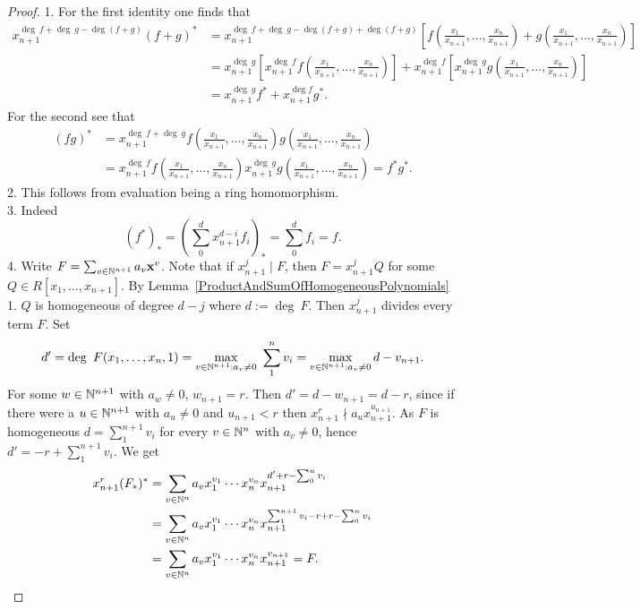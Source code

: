 \begin{proof}
    1. For the first identity one finds that 
    \begin{align*}
        x_{n+1}^{\deg\ f +\deg \ g - \deg( f+g)}(f+g)^\ast &=x_{n+1}^{\deg\ f +\deg \ g - \deg( f+g)+\deg(f+g)}\left[f\left(\frac{x_1}{x_{n+1}},\dots,\frac{x_n}{x_{n+1}}\right) + g\left(\frac{x_1}{x_{n+1}},\dots,\frac{x_n}{x_{n+1}}\right)\right]\\ &= x_{n+1}^{\deg\ g}\left[x_{n+1}^{\deg\ f}f\left(\frac{x_1}{x_{n+1}},\dots,\frac{x_n}{x_{n+1}}\right)\right] + x_{n+1}^{\deg\ f}\left[x_{n+1}^{\deg\ g}g\left(\frac{x_1}{x_{n+1}},\dots,\frac{x_n}{x_{n+1}}\right)\right]\\
        &= x_{n+1}^{\deg\ g}f^\ast+x_{n+1}^{\deg f}g^\ast.
    \end{align*}
    For the second see that
    \begin{align*}
        \left(fg\right)^\ast &= x_{n+1}^{\deg\ f+ \deg \ g} f\left(\frac{x_1}{x_{n+1}},\dots,\frac{x_n}{x_{n+1}}\right)g\left(\frac{x_1}{x_{n+1}},\dots,\frac{x_n}{x_{n+1}}\right)\\  &= x_{n+1}^{\deg \ f}f\left(\frac{x_1}{x_{n+1}},\dots,\frac{x_n}{x_{n+1}}\right)x_{n+1}^{\deg\ g}g\left(\frac{x_1}{x_{n+1}},\dots,\frac{x_n}{x_{n+1}}\right)=f^\ast g^\ast.
    \end{align*}
    2. This follows from evaluation being a ring homomorphism.\\
    3. Indeed
    $$(f^\ast)_\ast = \left(\sum_0^d x_{n+1}^{d-i}f_i\right)_\ast= \sum_0^df_i =f.$$
    4. Write $F=\sum_{v\in\mathbb{N}^{n+1}} a_v\mathbf{x}^v$. Note that if $x_{n+1}^j\mid F$, then $F= x_{n+1}^j Q$ for some $Q\in R[x_1,\dots,x_{n+1}]$. By Lemma~\ref{ProductAndSumOfHomogeneousPolynomials} 1. $Q$ is homogeneous of degree $d-j$ where $d := \deg \ F$. Then $x_{n+1}^j$ divides every term $F$. Set 
    $$d' = \deg \ F(x_1,\dots,x_n,1) = \max_{v\in\mathbb{N}^{n+1} : a_v\neq 0}\ \sum_1^n v_i = \max_{v\in\mathbb{N}^{n+1}:a_v\neq0} d-v_{n+1}.$$
    For some $w\in\mathbb{N}^{n+1}$ with $a_w\neq0$, $w_{n+1} = r$. Then $d' = d-w_{n+1}=d-r$, since if there were a $u\in \mathbb{N}^{n+1}$ with $a_u\neq0 $ and $u_{n+1}<r$ then $x_{n+1}^r\nmid a_ux_{n+1}^{u_{n+1}}.$ As $F$ is homogeneous $d = \sum_1^{n+1} v_i$ for every $v\in \mathbb{N}^n$ with $a_v\neq0$, hence $d' = -r+\sum_1^{n+1}v_i$. We get
    \begin{align*}
        x_{n+1}^r(F_\ast)^\ast &= \sum_{v\in \mathbb{N}^{n}} a_v x_1^{v_1}\cdots x_{n}^{v_n}x_{n+1}^{d'+r-\sum_0^n v_i}\\
        &=\sum_{v\in \mathbb{N}^{n}} a_v x_1^{v_1}\cdots x_{n}^{v_n}x_{n+1}^{\sum_1^{n+1}v_i -r+r-\sum_0^n v_i}\\ 
        &= \sum_{v\in \mathbb{N}^{n}} a_v x_1^{v_1}\cdots x_{n}^{v_n}x_{n+1}^{v_{n+1}}=F.
    \end{align*}
\end{proof}
